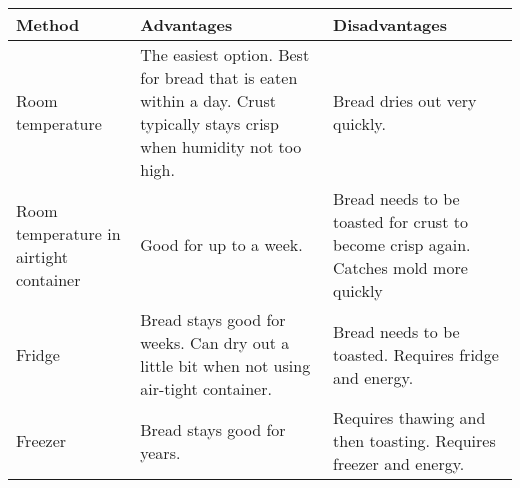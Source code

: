 \def\arraystretch{1.6}
\begin{tabular}{@{}p{}p{}p{}@{}}
\toprule
\textbf{Method}     & \textbf{Advantages}            & \textbf{Disadvantages}       \\
\midrule
Room temperature                          & The easiest option. Best for bread that is eaten within a day.
                                            Crust typically stays crisp when humidity not too high.
                                          & Bread dries out very quickly.\\

Room temperature in airtight container    & Good for up to a week.
                                          & Bread needs to be toasted for crust to become crisp again. Catches mold more quickly\\

Fridge                                    & Bread stays good for weeks. Can dry out a little bit when not using air-tight container.
                                          & Bread needs to be toasted. Requires fridge and energy.\\

Freezer                                   & Bread stays good for years.
                                          & Requires thawing and then toasting. Requires freezer and energy.\\
\bottomrule
\end{tabular}
